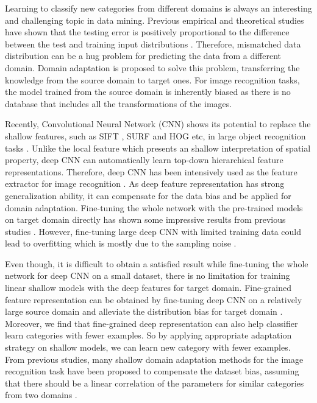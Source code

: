 ﻿Learning to classify new categories from different domains is always an interesting and challenging topic in data mining.
Previous empirical and theoretical studies have shown that the testing error is positively proportional to the difference between the test and training input distributions \cite{ben2007analysis} \cite{blitzer2008learning}. Therefore, mismatched data distribution can be a hug problem for predicting the data from a different domain. Domain adaptation is proposed to solve this problem, transferring the knowledge from the source domain to target ones. For image recognition tasks, the model trained from the source domain is inherently biased as there is no database that includes all the transformations of the images.

Recently, Convolutional Neural Network (CNN) shows its potential to replace the shallow features, such as SIFT \cite{lowe1999object}, SURF \cite{bay2006surf} and HOG \cite{dalal2005histograms} etc, in large object recognition tasks \cite{krizhevsky2012imagenet} \cite{zeiler2014visualizing} \cite{simonyan2014very}. Unlike the local feature which presents an shallow interpretation of spatial property, deep CNN can automatically learn top-down hierarchical feature representations. Therefore, deep CNN has been intensively used as the feature extractor for image recognition \cite{farabet2013learning}. As deep feature representation has strong generalization ability, it can compensate for the data bias and be applied for domain adaptation. Fine-tuning the whole network with the pre-trained models on target domain directly has shown some impressive results from previous studies \cite{zeiler2014visualizing} \cite{Chatfield14} \cite{hoffman2013one} \cite{NIPS2014_Zhou}.
However, fine-tuning large deep CNN with limited training data could lead to overfitting which is mostly due to the sampling noise \cite{srivastava2014dropout}.

Even though, it is difficult to obtain a satisfied result while fine-tuning the whole network for deep CNN on a small dataset, there is no limitation for training linear shallow models with the deep features for target domain. Fine-grained feature representation can be obtained by fine-tuning deep CNN on a relatively large source domain and alleviate the distribution bias for target domain \cite{zhang2014part}. Moreover, we find that fine-grained deep representation can also help classifier learn categories with fewer examples.
So by applying appropriate adaptation strategy on shallow models, we can learn new category with fewer examples. From previous studies, many shallow domain adaptation methods for the image recognition task have been proposed to compensate the dataset bias, assuming that there should be a linear correlation of the parameters for similar categories from two domains \cite{daume2009frustratingly} \cite{yang2007adapting} \cite{aytar2011tabula}.

